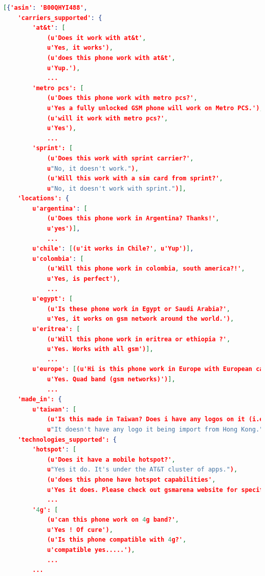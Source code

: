 \documentclass[LaM,oneside,binding=0.6cm]{sapthesis}
\begin{document}
\begin{lstlisting}[language=json]
[{'asin': 'B00QHYI488',
  	'carriers_supported': {
	  	'at&t': [
	  		(u'Does it work with at&t',
	        u'Yes, it works'),
	        (u'does this phone work with at&t',
	        u'Yup.'),
	        ...
	    'metro pcs': [
	    	(u'Does this phone work with metro pcs?',
	        u'Yes a fully unlocked GSM phone will work on Metro PCS.'),
	        (u'will it work with metro pcs?',
	        u'Yes'),
	        ...
	    'sprint': [
	    	(u'Does this work with sprint carrier?',
	        u"No, it doesn't work."),
	        (u'Will this work with a sim card from sprint?',
	        u"No, it doesn't work with sprint.")],
  	'locations': {
    	u'argentina': [
    		(u'Does this phone work in Argentina? Thanks!',
            u'yes')],
            ...
        u'chile': [(u'it works in Chile?', u'Yup')],
        u'colombia': [
            (u'Will this phone work in colombia, south america?!',
            u'Yes, is perfect'),
            ...
        u'egypt': [
        	(u'Is these phone work in Egypt or Saudi Arabia?',
            u'Yes, it works on gsm network around the world.'),
        u'eritrea': [
        	(u'Will this phone work in eritrea or ethiopia ?',
            u'Yes. Works with all gsm')],
            ...
        u'europe': [(u'Hi is this phone work in Europe with European card',
            u'Yes. Quad band (gsm networks)')],
            ...        
  	'made_in': {
  		u'taiwan': [
  			(u'Is this made in Taiwan? Does i have any logos on it (i.e. AT&T)?',
            u"It doesn't have any logo it being import from Hong Kong.")]},
  	'technologies_supported': {
  		'hotspot': [
  			(u'Does it have a mobile hotspot?',
            u"Yes it do. It's under the AT&T cluster of apps."),
            (u'does this phone have hotspot capabilities',
            u'Yes it does. Please check out gsmarena website for specific details. Check reviews on youtube.'),
            ...
        '4g': [
            (u'can this phone work on 4g band?',
            u'Yes ! Of cure'),
            (u'Is this phone compatible with 4g?',
            u'compatible yes.....'),
            ...
        ...
                                    
\end{lstlisting}
\end{document}
